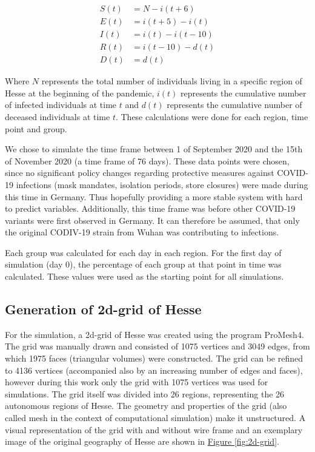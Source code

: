 \begin{align}
	S(t) &= N - i(t+6)\\
	E(t) &= i(t+5) - i(t)\\
	I(t) &= i(t) - i(t-10)\\
	R(t) &= i(t-10) - d(t)\\
	D(t) &= d(t)
\end{align}

\par
Where $N$ represents the total number of individuals living in a specific region of Hesse at the beginning of the pandemic, $i(t)$
represents the cumulative number of infected individuals at time $t$ and $d(t)$ represents the cumulative number of deceased
individuals at time $t$. These calculations were done for each region, time point and group.\newline

We chose to simulate the time frame between 1 of September 2020 and the 15{th} of November 2020 (a time frame of 76 days). These
data points were chosen, since no significant policy changes regarding protective measures against COVID-19 infections
(mask mandates, isolation periods, store closures)  were made during this time in Germany. Thus hopefully providing a more stable system
with hard to predict variables. Additionally, this time frame was before other COVID-19 variants were first observed in
Germany\cite{??}. It can therefore be assumed, that only the original CODIV-19 strain from Wuhan was contributing to infections.\newline

Each group was calculated for each day in each region. For the first day of simulation (day 0), the percentage of each group at that
point in time was calculated. These values were used as the starting point for all simulations.


\subsection{Generation of 2d-grid of Hesse}
For the simulation, a 2d-grid of Hesse was created using the program ProMesh4. The grid was manually drawn and consisted
of 1075 vertices and 3049 edges, from which 1975 faces (triangular volumes) were constructed. The grid can be refined
to 4136 vertices (accompanied also by an increasing number of edges and faces), however during this work only the grid
with 1075 vertices was used for simulations. The grid itself was divided into 26 regions, representing the 26 autonomous
regions of Hesse. The geometry and properties of the grid (also called mesh in the context of computational simulation)
make it unstructured. A visual representation of the grid with and without wire frame and an exemplary
image of the original geography of Hesse are shown in \hyperref[fig:2d-grid]{Figure \ref*{fig:2d-grid}}.

